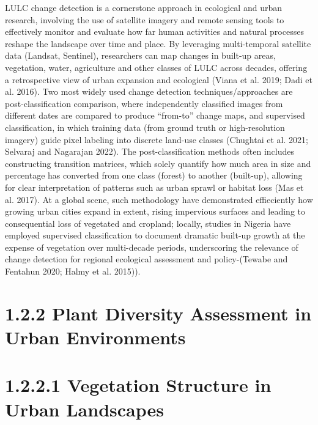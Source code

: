 LULC change detection is a cornerstone approach in ecological and urban research, involving the use of satellite imagery and remote sensing tools to effectively monitor and evaluate how far human activities and natural processes reshape the landscape over time and place. By leveraging multi-temporal satellite data (Landsat, Sentinel), researchers can map changes in built-up areas, vegetation, water, agriculture and other classes of LULC across decades, offering a retrospective view of urban expansion and ecological (Viana et al. 2019; Dadi et al. 2016). Two most widely used change detection techniques/approaches are post-classification comparison, where independently classified images from different dates are compared to produce ``from-to'' change maps, and supervised classification, in which training data (from ground truth or high-resolution imagery) guide pixel labeling into discrete land-use classes (Chughtai et al. 2021; Selvaraj and Nagarajan 2022). The post-classification methods often includes constructing transition matrices, which solely quantify how much area in size and percentage has converted from one class (forest) to another (built-up), allowing for clear interpretation of patterns such as urban sprawl or habitat loss (Mas et al. 2017). At a global scene, such methodology have demonstrated effieciently how growing urban cities expand in extent, rising impervious surfaces and leading to consequential loss of vegetated and cropland; locally, studies in Nigeria have employed supervised classification to document dramatic built-up growth at the expense of vegetation over multi-decade periods, underscoring the relevance of change detection for regional ecological assessment and policy-(Tewabe and Fentahun 2020; Halmy et al. 2015)).
\hypertarget{plant-diversity-assessment-in-urban-environments}{%
\section{\texorpdfstring{\textbf{1.2.2 Plant Diversity Assessment in Urban Environments}}{1.2.2 Plant Diversity Assessment in Urban Environments}}\label{plant-diversity-assessment-in-urban-environments}}

\hypertarget{vegetation-structure-in-urban-landscapes}{%
\section{\texorpdfstring{\textbf{1.2.2.1 Vegetation Structure in Urban Landscapes}}{1.2.2.1 Vegetation Structure in Urban Landscapes}}\label{vegetation-structure-in-urban-landscapes}}

